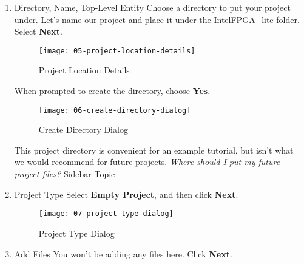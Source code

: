 \begin{flushleft}
\begin{enumerate}[
	label=\textbf{Step \arabic*.},
	leftmargin=*,
	widest={00},
	align=left]
\begin{enumerate}[
	label=\textbf{Step \arabic{enumi}\alph*.},
	leftmargin=*,
	align=left]
\item Directory, Name, Top-Level Entity
\newline
\newline
Choose a directory to put your project under. Let's name our project  and place it under the IntelFPGA\_lite folder. Select \textbf{Next}.

\begin{figure}[H]
\centering
\texttt{[image: 05-project-location-details]}
\caption{Project Location Details}
\label{fig:05-project-location-details}
\end{figure}

When prompted to create the directory, choose \textbf{Yes}.

\begin{figure}[H]
\centering
\texttt{[image: 06-create-directory-dialog]}
\caption{Create Directory Dialog}
\label{fig:06-create-directory-dialog}
\end{figure}

This project directory is convenient for an example tutorial, but isn't what we would recommend for future projects.
\newline
\emph{Where should I put my future project files?} \hyperlink{side10}{\underline{Sidebar Topic}}
\newline

\item Project Type
\newline
\newline
Select \textbf{Empty Project}, and then click \textbf{Next}.

\begin{figure}[H]
\centering
\texttt{[image: 07-project-type-dialog]}
\caption{Project Type Dialog}
\label{fig:07-project-type-dialog}
\end{figure}

\item Add Files
\newline
\newline
You won't be adding any files here. Click \textbf{Next}.


\end{enumerate}
\end{enumerate}
\end{flushleft}
